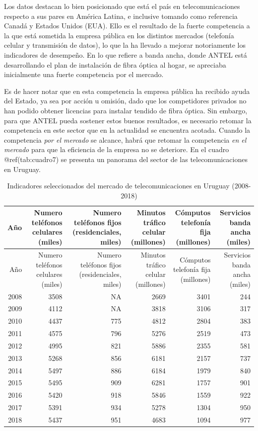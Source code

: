 \documentclass[
  12pt,
  spanish,
]{book}
\begin{document}
Los datos destacan lo bien posicionado que está el país en
telecomunicaciones respecto a sus pares en América Latina, e inclusive
tomando como referencia Canadá y Estados Unidos (EUA). Ello es el
resultado de la fuerte competencia a la que está sometida la empresa
pública en los distintos mercados (telefonía celular y transmisión de
datos), lo que la ha llevado a mejorar notoriamente los indicadores de
desempeño. En lo que refiere a banda ancha, donde ANTEL está
desarrollando el plan de instalación de fibra óptica al hogar, se
apreciaba inicialmente una fuerte competencia por el mercado.

Es de hacer notar que en esta competencia la empresa pública ha recibido
ayuda del Estado, ya sea por acción u omisión, dado que los competidores
privados no han podido obtener licencias para instalar tendido de fibra
óptica. Sin embargo, para que ANTEL pueda sostener estos buenos
resultados, es necesario retomar la competencia en este sector que en la
actualidad se encuentra acotada. Cuando la competencia \emph{por el
mercado} se alcance, habrá que retomar la competencia \emph{en el
mercado} para que la eficiencia de la empresa no se deteriore. En el
cuadro @ref(tab:cuadro7) se presenta un panorama del sector de las
telecomunicaciones en Uruguay.

\begin{longtable}[]{@{}rrrrrr@{}}
\caption{Indicadores seleccionados del mercado de telecomunicaciones en
Uruguay (2008-2018)}\tabularnewline
\toprule
Año & Numero teléfonos celulares (miles) & Numero teléfonos fijos
(residenciales, miles) & Minutos tráfico celular (millones) & Cómputos
telefonía fija (millones) & Servicios banda ancha (miles)\tabularnewline
\midrule
\endfirsthead
\toprule
Año & Numero teléfonos celulares (miles) & Numero teléfonos fijos
(residenciales, miles) & Minutos tráfico celular (millones) & Cómputos
telefonía fija (millones) & Servicios banda ancha (miles)\tabularnewline
\midrule
\endhead
2008 & 3508 & NA & 2669 & 3401 & 244\tabularnewline
2009 & 4112 & NA & 3818 & 3106 & 317\tabularnewline
2010 & 4437 & 775 & 4812 & 2804 & 383\tabularnewline
2011 & 4575 & 796 & 5276 & 2519 & 473\tabularnewline
2012 & 4995 & 821 & 5886 & 2355 & 581\tabularnewline
2013 & 5268 & 856 & 6181 & 2157 & 737\tabularnewline
2014 & 5497 & 886 & 6184 & 1979 & 840\tabularnewline
2015 & 5495 & 909 & 6281 & 1757 & 901\tabularnewline
2016 & 5420 & 918 & 5846 & 1559 & 922\tabularnewline
2017 & 5391 & 934 & 5278 & 1304 & 950\tabularnewline
2018 & 5437 & 951 & 4683 & 1094 & 977\tabularnewline
\bottomrule
\end{longtable}
\end{document}
